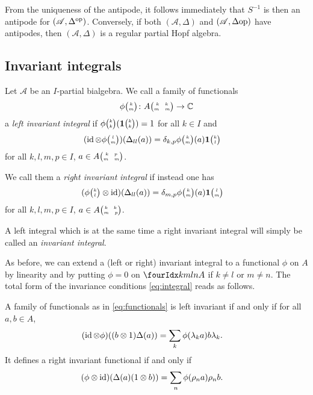 From the uniqueness of the antipode, it follows immediately that $S^{-1}$ is then an antipode for $(\mathscr{A},\Delta^{\operatorname{\mathrm{op}}})$. Conversely, if both $(\mathscr{A},\Delta)$ and $(\mathscr{A},\Delta{\operatorname{\mathrm{op}}})$ have antipodes, then $(\mathscr{A},\Delta)$ is a regular partial Hopf algebra. 

\subsection{Invariant integrals}


\begin{Def}
  Let $\mathscr{A}$ be an $I$-partial bialgebra.  We call a family of
  functionals
\begin{align} \label{eq:functionals}
  \phi{\tiny {\begin{pmatrix} k\\m\end{pmatrix}}} \colon A{\tiny \begin{pmatrix} k \quad k \\ m \quad m\end{pmatrix}} \to \mathbb{C}
\end{align}
a \emph{left invariant} \emph{integral} if
 $\phi{\tiny {\begin{pmatrix} k\\k\end{pmatrix}}}(\mathbf{1}{\tiny {\begin{pmatrix} k\\k\end{pmatrix}}})=1$ for all $k\in
I$ and
\begin{align}
  \label{eq:integral}
   (\operatorname{id} \otimes \phi{\tiny {\begin{pmatrix} l\\m\end{pmatrix}}})(\Delta_{ll}(a)) 
&= \delta_{k,p} \phi{\tiny {\begin{pmatrix} k\\m\end{pmatrix}}}(a)
  \mathbf{1}{\tiny {\begin{pmatrix} k\\l\end{pmatrix}}} 
\end{align}
 for all $k,l,m,p\in I$, $a \in A{\tiny \begin{pmatrix} k \quad p \\ m \quad m\end{pmatrix}}$. 
 
 We call them a \emph{right invariant}  \emph{integral} if instead one has \begin{align}
  (\phi{\tiny {\begin{pmatrix} k\\l\end{pmatrix}}} \otimes
  \operatorname{id})(\Delta_{ll}(a))&= \delta_{m,p} \phi{\tiny {\begin{pmatrix} k\\m\end{pmatrix}}}(a) \mathbf{1}{\tiny {\begin{pmatrix} l\\m\end{pmatrix}}}\end{align}
 for all $k,l,m,p\in I$, $a \in A{\tiny \begin{pmatrix} k \quad k \\ m \quad p\end{pmatrix}}$. 
 
 A left integral which is at the same time a right invariant integral will simply be called an \emph{invariant integral}.
\end{Def}

As before, we can extend a (left or right) invariant integral to a functional $\phi$ on $A$ by linearity and by putting $\phi=0$ on $\Gr{A}{k}{l}{m}{n}$ if $k\neq l$ or $m\neq n$. The total form of the invariance conditions
\eqref{eq:integral}  reads as follows. 

\begin{Lem} \label{lemma:total-integral}
  A family of functionals  as in   \eqref{eq:functionals}
  is left invariant
  if and only if
for all $a,b\in A$,
  \begin{align*}
(\operatorname{id}\otimes \phi)((b\otimes 1)\Delta(a)) &= \sum_{k}\phi(\lambda_{k}a)b\lambda_k.
      \end{align*}
      It defines a right invariant functional if and only if 
   \begin{align*}   (\phi\otimes \operatorname{id})(\Delta(a)(1\otimes b)) &= \sum_{n}
\phi(\rho_{n} a)\rho_n b.\end{align*}
\end{Lem}

